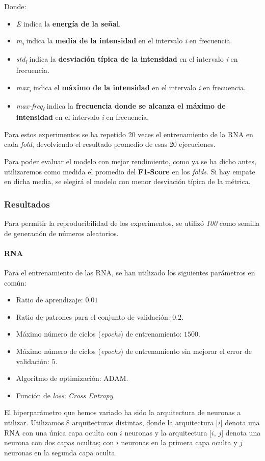 \documentclass[12pt]{article}
\begin{document}
Donde:
\begin{itemize}
	\item \textit{E} indica la \textbf{energía de la señal}.
	\item \textit{m\textsubscript{i}} indica la \textbf{media de la intensidad} en el intervalo \textit{i} en frecuencia.
	\item \textit{std\textsubscript{i}} indica la \textbf{desviación típica de la intensidad} en el intervalo \textit{i} en frecuencia.
	\item \textit{max\textsubscript{i}} indica el \textbf{máximo de la intensidad} en el intervalo \textit{i} en frecuencia.
	\item \textit{max-freq\textsubscript{i}} indica la \textbf{frecuencia donde se alcanza el máximo de intensidad} en el intervalo \textit{i} en frecuencia.
\end{itemize}	


\bigskip
Para estos experimentos se ha repetido 20 veces el entrenamiento de la RNA en cada \textit{fold}, devolviendo el resultado promedio de esas 20 ejecuciones.

\bigskip
Para poder evaluar el modelo con mejor rendimiento, como ya se ha dicho antes, utilizaremos como medida el promedio
del \textbf{F1-Score} en los \textit{folds}. Si hay empate en dicha media, se elegirá el modelo con menor
desviación típica de la métrica.


\newpage
\subsubsection{Resultados}
Para permitir la reproducibilidad de los experimentos, se utilizó \textit{100} como semilla de generación de números
aleatorios.

\paragraph{RNA}

Para el entrenamiento de las RNA, se han utilizado los siguientes parámetros en común:
\begin{itemize}
	\item Ratio de aprendizaje: $0.01$
	\item Ratio de patrones para el conjunto de validación: $0.2$.
	\item Máximo número de ciclos (\textit{epochs}) de entrenamiento: $1500$.
	\item Máximo número de ciclos (\textit{epochs}) de entrenamiento sin mejorar el error de validación: $5$.
	\item Algoritmo de optimización: ADAM.
	\item Función de \textit{loss}: \textit{Cross Entropy}.
\end{itemize}
El hiperparámetro que hemos variado ha sido la arquitectura de neuronas a utilizar. Utilizamos 8 arquitecturas distintas,
donde la arquitectura [$i$] denota una RNA con una única capa oculta con $i$ neuronas y la arquitectura [$i$, $j$] 
denota una neurona con dos capas ocultas; con $i$ neuronas en la primera capa oculta y $j$ neuronas en la segunda capa oculta.
\end{document}
